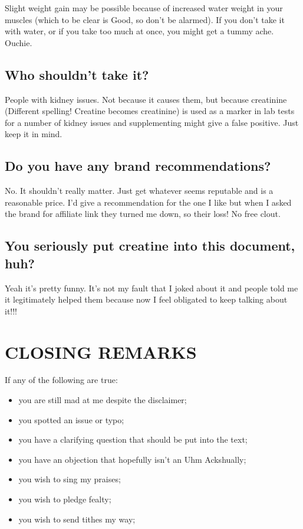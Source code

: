 \documentclass{article}
\begin{document}
Slight weight gain may be possible because of increased water weight in your muscles (which to be clear is Good, so don't be alarmed). If you don’t take it with water, or if you take too much at once, you might get a tummy ache. Ouchie.

\subsection{Who shouldn’t take it?}

People with kidney issues. Not because it causes them, but because creatinine (Different spelling! Creatine becomes creatinine) is used as a marker in lab tests for a number of kidney issues and supplementing might give a false positive. Just keep it in mind.

\subsection{Do you have any brand recommendations?}

No. It shouldn’t really matter. Just get whatever seems reputable and is a reasonable price. I’d give a recommendation for the one I like but when I asked the brand for affiliate link they turned me down, so their loss! No free clout.

\subsection{You seriously put creatine into this document, huh?}

Yeah it’s pretty funny. It’s not my fault that I joked about it and people told me it legitimately helped them because now I feel obligated to keep talking about it!!!

 

\section{CLOSING REMARKS}

If any of the following are true:

\begin{itemize}
\item you are still mad at me despite the disclaimer;

\item you spotted an issue or typo;

\item you have a clarifying question that should be put into the text;

\item you have an objection that hopefully isn’t an Uhm Ackshually;

\item you wish to sing my praises;

\item you wish to pledge fealty; 

\item you wish to send tithes my way;
\end{itemize}
\end{document}

